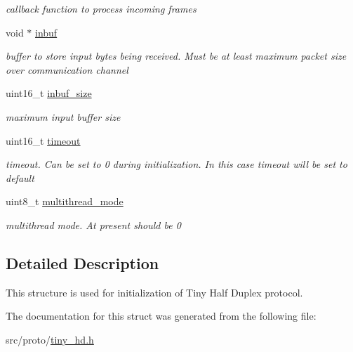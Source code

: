 \begin{DoxyCompactItemize}
\begin{DoxyCompactList}\small\item\em callback function to process incoming frames \end{DoxyCompactList}\item 
\mbox{\label{structSTinyHdInit___a5996a48606a90ff9938e4037612cf97d}} 
void $\ast$ \hyperlink{structSTinyHdInit___a5996a48606a90ff9938e4037612cf97d}{inbuf}
\begin{DoxyCompactList}\small\item\em buffer to store input bytes being received. Must be at least maximum packet size over communication channel \end{DoxyCompactList}\item 
\mbox{\label{structSTinyHdInit___a0eed47c62a16fa29435d480541989cf6}} 
uint16\+\_\+t \hyperlink{structSTinyHdInit___a0eed47c62a16fa29435d480541989cf6}{inbuf\+\_\+size}
\begin{DoxyCompactList}\small\item\em maximum input buffer size \end{DoxyCompactList}\item 
\mbox{\label{structSTinyHdInit___ac7a1ae9314efc1296d78927198f07ac8}} 
uint16\+\_\+t \hyperlink{structSTinyHdInit___ac7a1ae9314efc1296d78927198f07ac8}{timeout}
\begin{DoxyCompactList}\small\item\em timeout. Can be set to 0 during initialization. In this case timeout will be set to default \end{DoxyCompactList}\item 
\mbox{\label{structSTinyHdInit___a404947e25922fa8400daa924a032897e}} 
uint8\+\_\+t \hyperlink{structSTinyHdInit___a404947e25922fa8400daa924a032897e}{multithread\+\_\+mode}
\begin{DoxyCompactList}\small\item\em multithread mode. At present should be 0 \end{DoxyCompactList}\end{DoxyCompactItemize}


\subsection{Detailed Description}
This structure is used for initialization of Tiny Half Duplex protocol. 

The documentation for this struct was generated from the following file\+:\begin{DoxyCompactItemize}
\item 
src/proto/\hyperlink{tiny__hd_8h}{tiny\+\_\+hd.\+h}\end{DoxyCompactItemize}
